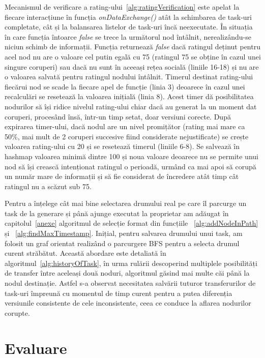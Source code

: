 \documentclass[12pt,a4paper]{report}
\begin{document}
Mecanismul de verificare a rating-ului~\ref{alg:ratingVerification} este apelat la fiecare interacțiune în funcția \textit{onDataExchange()} atât la schimbarea de task-uri completate, cât și la balansarea listelor de task-uri încă neexecutate. În situația în care funcția întoarce \textit{false} se trece la următorul nod întâlnit, nerealizându-se niciun schimb de informații. Funcția returnează \textit{false} dacă ratingul deținut pentru acel nod nu are o valoare cel putin egală cu 75 (ratingul 75 se obține în cazul unei singure coruperi) sau dacă nu sunt în aceeași rețea socială (liniile 16-18) și nu are o valoarea salvată pentru ratingul nodului întâlnit. Timerul destinat rating-ului fiecărui nod se scade la fiecare apel de funcție (linia 3) deoarece în cazul unei recalculări se resetează la valoarea inițială (linia 8). Acest timer dă posibilitatea nodurilor să își ridice nivelul rating-ului chiar dacă au generat la un moment dat coruperi, procesând însă, într-un timp setat, doar versiuni corecte. După expirarea timer-ului, dacă nodul are un nivel promițător (rating mai mare ca 50\%, mai mult de 2 coruperi succesive fiind considerate nejustificate) se crește valoarea rating-ului cu 20 și se resetează timerul (liniile 6-8). Se salvează în hashmap valoarea minimă dintre 100 și noua valoare deoarece nu se permite unui nod să își crească intenționat ratingul o perioadă, urmând ca mai apoi să corupă un număr mare de informații și să fie considerat de încredere atât timp cât ratingul nu a scăzut sub 75. 
 
Pentru a înțelege cât mai bine selectarea drumului real pe care îl parcurge un task de la generare și până ajunge executat la proprietar am adăugat în capitolul~\ref{anexe} algoritmul de selecție format din funcțiile ~\ref{alg:addNodeInPath} și ~\ref{alg:findMaxTimestamp}. Inițial, pentru salvarea drumului unui task, am folosit un graf orientat realizând o parcurgere BFS pentru a selecta drumul curent străbătut. Această abordare este detaliată în algoritmul~\ref{alg:historyOfTask}, în urma rulării descoperind multiplele posibilități de transfer între aceleași două noduri, algoritmul găsind mai multe căi până la nodul destinație. Astfel s-a observat necesitatea salvării tuturor transferurilor de task-uri împreună cu momentul de timp curent pentru a putea diferenția versiunile consistente de cele inconsistente, ceea ce conduce la aflarea nodurilor corupte.
\chapter{Evaluare} \label{evaluare}
\end{document}
